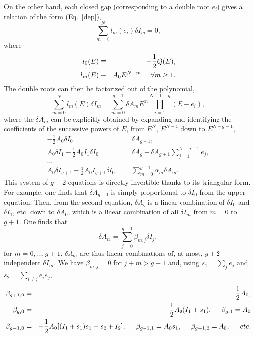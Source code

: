 \documentclass[]{revtex4-1}
\begin{document}
On the other hand, each closed gap (corresponding to a double root $e_i$) gives a relation of the form (Eq.~\ref{dep}),
\begin{equation}
  \sum_{m=0}^N l_m(e_i) \delta I_m =0,
\end{equation}
where
\begin{eqnarray}
  l_0(E)& \equiv & -\frac{1}{2} Q(E), \\
  l_m(E) & \equiv & A_0 E^{N-m} \hspace{.5cm} \forall m \geq 1.
\end{eqnarray}
The double roots can then be factorized out of the polynomial,
\begin{equation}
\sum_{m=0}^N l_m(E) \delta I_m  = \sum_{m=0}^{g+1} \delta A_m E^m \prod_{i=1}^{N-1-g} (E-e_i), \label{lmE} 
\end{equation}
where the $\delta A_m$ can be explicitly obtained by expanding and identifying the coefficients of the successive powers of $E$, from $E^N$, $E^{N-1}$ down to $E^{N-g-1}$,
\begin{eqnarray}
 -\frac{1}{2} A_0 \delta I_0 &=&   \delta A_{g+1}, \\
  A_0 \delta I_1  -\frac{1}{2} A_0 I_1 \delta I_0  &=& \delta A_{g} -\delta A_{g+1} \sum_{j=1}^{N-g-1} e_j,  \\
  \dots \\
  A_0 \delta I_{g+1} -\frac{1}{2} A_0 I_{g+1} \delta I_0 &=& \sum_{m=0}^{g+1} \alpha_m \delta A_m.
  \end{eqnarray}
This system of $g+2$ equations is directly invertible thanks to its triangular form.  For example,  one finds that $\delta A_{g+1}$ is simply proportional to $\delta I_0$ from the upper equation. Then, from the second equation, $\delta A_g$  is a linear combination of $\delta I_0$ and $\delta I_1$, etc. down to $\delta A_0$, which is a linear combination of all $\delta I_m$ from $m=0$ to $g+1$. One finds that
\begin{equation}
\delta A_m= \sum_{j=0}^{g+1} \beta_{m,j} \delta I_j, \label{am}
\end{equation}
for $m=0,\dots,g+1$. $\delta A_m$ are thus linear combinations of, at most, $g+2$ independent $\delta I_m$. 
We have  $\beta_{m,j}=0$ for $j+m>g+1$ and, using $s_1=\sum_j e_j$ and $s_2=\sum_{i \neq j} e_ie_j$,
\begin{eqnarray}
  \beta_{g+1,0} &=& -\frac{1}{2} A_0, \\
  \beta_{g,0} &=& -\frac{1}{2} A_0 (I_1+s_1), \hspace{.5cm} \beta_{g,1}=A_0 \\
\beta_{g-1,0}&=& -\frac{1}{2}A_0[(I_1+s_1)s_1 + s_2 +I_2], \hspace{.5cm} \beta_{g-1,1}=A_0 s_1, \hspace{.5cm}  \beta_{g-1,2}= A_0,  \hspace{.5cm} etc.
\end{eqnarray}
\end{document}
